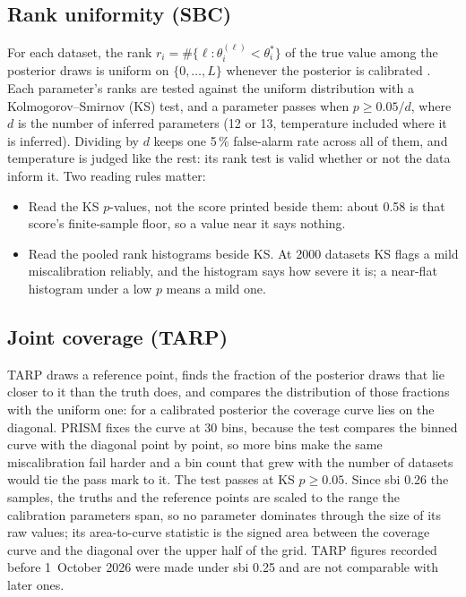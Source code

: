 \documentclass[10pt,a4paper]{article}
\newcommand{\code}[1]{\texttt{\detokenize{#1}}}
\begin{document}
\subsection{Rank uniformity (SBC)}

For each dataset, the rank $r_i=\#\{\ell:\theta_i^{(\ell)}<\theta_i^\ast\}$ of the true value among the posterior draws is
uniform on $\{0,\dots,L\}$ whenever the posterior is calibrated \cite{talts2018}. Each parameter's ranks are tested
against the uniform distribution with a Kolmogorov--Smirnov (KS) test, and a parameter passes when $p\ge 0.05/d$, where $d$
is the number of inferred parameters (12 or 13, temperature included where it is inferred). Dividing by $d$ keeps one
5\,\% false-alarm rate across all of them, and temperature is judged like the rest: its rank test is valid whether or not
the data inform it. Two reading rules matter:
\begin{itemize}[leftmargin=1.4em,itemsep=1pt,topsep=2pt]
  \item Read the KS $p$-values, not the \code{c2st_ranks} score printed beside them: about 0.58 is that score's
        finite-sample floor, so a value near it says nothing.
  \item Read the pooled rank histograms beside KS. At 2000 datasets KS flags a mild miscalibration reliably, and the
        histogram says how severe it is; a near-flat histogram under a low $p$ means a mild one.
\end{itemize}

\subsection{Joint coverage (TARP)}

TARP \cite{lemos2023} draws a reference point, finds the fraction of the posterior draws that lie closer to it than the
truth does, and compares the distribution of those fractions with the uniform one: for a calibrated posterior the
coverage curve lies on the diagonal. PRISM fixes the curve at 30 bins, because the test compares the binned curve with
the diagonal point by point, so more bins make the same miscalibration fail harder and a bin count that grew with the
number of datasets would tie the pass mark to it. The test passes at KS $p\ge 0.05$. Since sbi 0.26 the samples, the
truths and the reference points are scaled to the range the calibration parameters span, so no parameter dominates
through the size of its raw values; its area-to-curve statistic is the signed area between the coverage curve and the
diagonal over the upper half of the grid. TARP figures recorded before 1~October 2026 were made under sbi 0.25 and are
not comparable with later ones.
\end{document}
